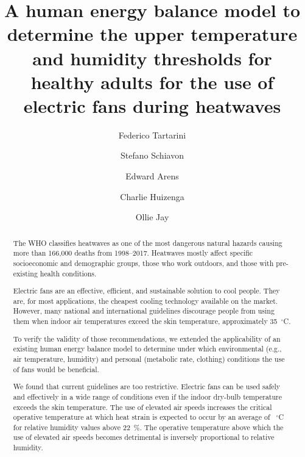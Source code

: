 
\begin{frontmatter}

\title{A human energy balance model to determine the upper temperature and humidity thresholds for healthy adults for the use of electric fans during heatwaves}

\author[sinBerBest]{Federico Tartarini}
\author[CBE]{Stefano Schiavon}
\author[CBE]{Edward Arens}
\author[CBE]{Charlie Huizenga}
 \author[USYD]{Ollie Jay}

\address[sinBerBest]{SinBerBEST, Berkeley Education Alliance for Research in Singapore, Singapore}
\address[CBE]{Center for the Built Environment, University of California, Berkeley, USA}
 \address[USYD]{Sydney School of Health Sciences, Faculty of Medicine and Health, The University of Sydney, Sydney, Australia}

\begin{abstract}
    The WHO classifies heatwaves as one of the most dangerous natural hazards causing more than 166,000 deaths from 1998--2017.
    Heatwaves mostly affect specific socioeconomic and demographic groups, those who work outdoors, and those with pre-existing health conditions.
    
    Electric fans are an effective, efficient, and sustainable solution to cool people.
    They are, for most applications, the cheapest cooling technology available on the market.
    However, many national and international guidelines discourage people from using them when indoor air temperatures exceed the skin temperature, approximately 35~$^{\circ}$C\@.
    
    To verify the validity of those recommendations, we extended the applicability of an existing human energy balance model to determine under which environmental (e.g., air temperature, humidity) and personal (metabolic rate, clothing) conditions the use of fans would be beneficial.
    
    We found that current guidelines are too restrictive.
    Electric fans can be used safely and effectively in a wide range of conditions even if the indoor dry-bulb temperature exceeds the skin temperature.
    The use of elevated air speeds increases the critical operative temperature at which heat strain is expected to occur by an average of ~$^{\circ}$C for relative humidity values above 22~\%\@.
    The operative temperature above which the use of elevated air speeds becomes detrimental is inversely proportional to relative humidity.
    

\end{abstract}
\end{frontmatter}
